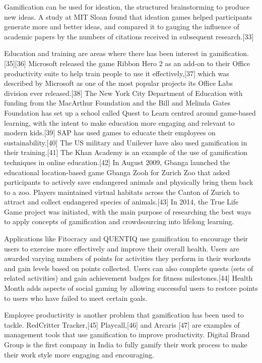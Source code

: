 Gamification can be used for ideation, the structured brainstorming to produce new ideas. A study at MIT Sloan found that ideation games helped participants generate more and better ideas, and compared it to gauging the influence of academic papers by the numbers of citations received in subsequent research.[33]

Education and training are areas where there has been interest in gamification.[35][36] Microsoft released the game Ribbon Hero 2 as an add-on to their Office productivity suite to help train people to use it effectively,[37] which was described by Microsoft as one of the most popular projects its Office Labs division ever released.[38] The New York City Department of Education with funding from the MacArthur Foundation and the Bill and Melinda Gates Foundation has set up a school called Quest to Learn centred around game-based learning, with the intent to make education more engaging and relevant to modern kids.[39] SAP has used games to educate their employees on sustainability.[40] The US military and Unilever have also used gamification in their training.[41] The Khan Academy is an example of the use of gamification techniques in online education.[42] In August 2009, Gbanga launched the educational location-based game Gbanga Zooh for Zurich Zoo that asked participants to actively save endangered animals and physically bring them back to a zoo. Players maintained virtual habitats across the Canton of Zurich to attract and collect endangered species of animals.[43] In 2014, the True Life Game project was initiated, with the main purpose of researching the best ways to apply concepts of gamification and crowdsourcing into lifelong learning.

Applications like Fitocracy and QUENTIQ use gamification to encourage their users to exercise more effectively and improve their overall health. Users are awarded varying numbers of points for activities they perform in their workouts and gain levels based on points collected. Users can also complete quests (sets of related activities) and gain achievement badges for fitness milestones.[44] Health Month adds aspects of social gaming by allowing successful users to restore points to users who have failed to meet certain goals.

Employee productivity is another problem that gamification has been used to tackle. RedCritter Tracker,[45] Playcall,[46] and Arcaris [47] are examples of management tools that use gamification to improve productivity. Digital Brand Group is the first company in India to fully gamify their work process to make their work style more engaging and encouraging.

